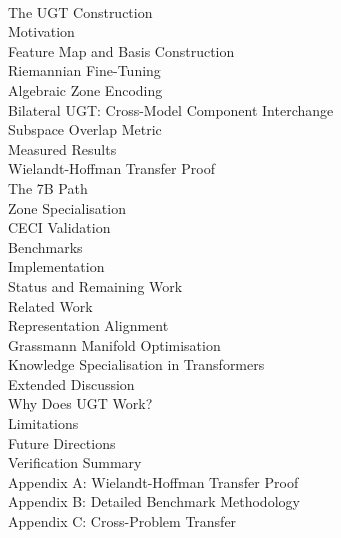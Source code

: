 \documentclass[11pt]{article}
\begin{document}
\\
\quad The UGT Construction\\
\quad \quad Motivation\\
\quad \quad Feature Map and Basis Construction\\
\quad \quad Riemannian Fine-Tuning\\
\quad \quad Algebraic Zone Encoding\\
\quad Bilateral UGT: Cross-Model Component Interchange\\
\quad \quad Subspace Overlap Metric\\
\quad \quad Measured Results\\
\quad \quad Wielandt-Hoffman Transfer Proof\\
\quad \quad The 7B Path\\
\quad Zone Specialisation\\
\quad CECI Validation\\
\quad Benchmarks\\
\quad Implementation\\
\quad Status and Remaining Work\\
\quad Related Work\\
\quad \quad Representation Alignment\\
\quad \quad Grassmann Manifold Optimisation\\
\quad \quad Knowledge Specialisation in Transformers\\
\quad Extended Discussion\\
\quad \quad Why Does UGT Work?\\
\quad \quad Limitations\\
\quad \quad Future Directions\\
\quad Verification Summary\\
\quad Appendix A: Wielandt-Hoffman Transfer Proof\\
\quad Appendix B: Detailed Benchmark Methodology\\
\quad Appendix C: Cross-Problem Transfer\\
\end{document}
